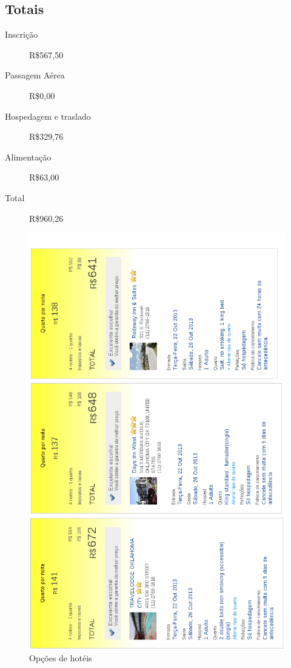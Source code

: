 \documentclass[brazil]{article}
\newcommand{\brl}{R\$}
\begin{document}
\subsection{Totais}
\begin{description}
	\item[Inscrição] \brl567,50
	\item[Passagem Aérea] \brl0,00
	\item[Hospedagem e traslado] \brl329,76
	\item[Alimentação] \brl63,00
	\item[Total] \brl960,26
\end{description}

\begin{figure}[htp]
\begin{center}
  \includegraphics[width=0.9\linewidth]{hoteis.png}
  \caption[Opções de hotéis]{Opções de hotéis}
\end{center}
\end{figure}
\end{document}
